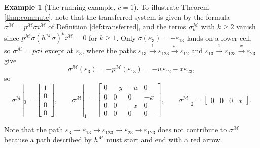 \documentclass[12pt]{amsart}
\theoremstyle{plain}
\theoremstyle{definition}
\newtheorem{example}[theorem]{Example}
\newcommand{\M}{\mathcal{M}}
\newcommand{\eps}{\varepsilon}
\begin{document}
\begin{example}[The running example, $c = 1$]
To illustrate Theorem \ref{thm:commute}, note that the transferred system is given by the formula $\sigma^{\M} = p^{\M} \sigma i^{\M}$ of Definition \ref{def:transferred}, and the terms $\sigma^{\M}_k$ with $k \ge 2$ vanish since $p^{\M} \sigma (h^{\M} \sigma)^k i^{\M}=0$ for $k \geq 1$.
    Only $\sigma(\eps_3) = -\eps_{13}$ lands on a lower cell, so $\sigma^{\M} = p \sigma i$ except at $\eps_3$, where the paths ${\eps_{13} \xrightarrow{1} \eps_{123} \xrightarrow{w} \eps_{12}}$ and ${\eps_{13} \xrightarrow{1} \eps_{123} \xrightarrow{x} \eps_{23}}$ give
    \[
        \sigma^{\M}(\eps_3) = -p^{\M}(\eps_{13}) = -w \eps_{12} - x \eps_{23} ,
    \]
    so
    \[
        \sigma^{\M}|_0 = \begin{bmatrix} 1\\ 0\\ 0\\ 0 \end{bmatrix}, \qquad
        \sigma^{\M}|_1 = \begin{bmatrix} 0 & -y & -w & 0\\ 0 & 0 & 0 & -x\\ 0 & 0 & -x & 0\\ 0 & 0 & 0 & 0 \end{bmatrix}, \qquad
        \sigma^{\M}|_2 = \begin{bmatrix} 0 & 0 & 0 & x \end{bmatrix}.
    \]

    Note that the path $\eps_3 \to \eps_{13} \to \eps_{123} \to \eps_{23} \to \eps_{123}$ does not contribute to $\sigma^\M$ because a path described by $h^\M$ must start and end with a red arrow.
    

\end{example}
\end{document}
